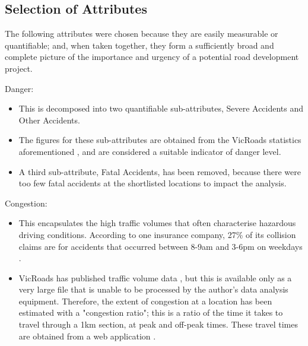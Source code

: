 \documentclass[11pt, a4paper]{article}
\begin{document}
    \subsection{Selection of Attributes}

    The following attributes were chosen because they are easily measurable or quantifiable; and, when taken together, they form a sufficiently broad and complete picture of the importance and urgency of a potential road development project.

    \hfill \break
    Danger:
    \begin{itemize}
        \item This is decomposed into two quantifiable sub-attributes, Severe Accidents and Other Accidents.
        \item The figures for these sub-attributes are obtained from the VicRoads statistics aforementioned \parencite{a3}, and are considered a suitable indicator of danger level.
        \item A third sub-attribute, Fatal Accidents, has been removed, because there were too few fatal accidents at the shortlisted locations to impact the analysis. 
    \end{itemize}

    \hfill \break
    Congestion:
    \begin{itemize}
        \item This encapsulates the high traffic volumes that often characterise hazardous driving conditions. According to one insurance company, 27\% of its collision claims are for accidents that occurred between 8-9am and 3-6pm on weekdays \parencite{a15}.
        \item VicRoads has published traffic volume data \parencite{a16}, but this is available only as a very large file that is unable to be processed by the author's data analysis equipment. Therefore, the extent of congestion at a location has been estimated with a "congestion ratio"; this is a ratio of the time it takes to travel through a 1km section, at peak and off-peak times. These travel times are obtained from a web application \parencite{a17}.
    \end{itemize}
\end{document}
